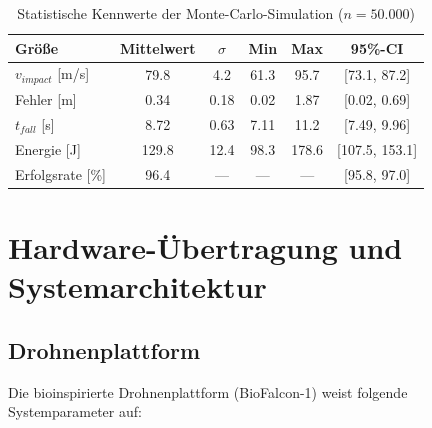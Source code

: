 ﻿\documentclass[12pt,a4paper]{article}
\theoremstyle{remark}
\begin{document}
	\begin{table}[H]
		\centering
		\caption{Statistische Kennwerte der Monte-Carlo-Simulation ($n = 50.000$)}
		\label{tab:statistik}
		\begin{tabular}{lccccc}
			\toprule
			\textbf{Größe} & \textbf{Mittelwert} & \textbf{$\sigma$} & \textbf{Min} & \textbf{Max} & \textbf{95\%-CI} \\
			\midrule
			$v_{impact}$ [m/s] & 79.8 & 4.2 & 61.3 & 95.7 & [73.1, 87.2] \\
			Fehler [m] & 0.34 & 0.18 & 0.02 & 1.87 & [0.02, 0.69] \\
			$t_{fall}$ [s] & 8.72 & 0.63 & 7.11 & 11.2 & [7.49, 9.96] \\
			Energie [J] & 129.8 & 12.4 & 98.3 & 178.6 & [107.5, 153.1] \\
			Erfolgsrate [\%] & 96.4 & --- & --- & --- & [95.8, 97.0] \\
			\bottomrule
		\end{tabular}
	\end{table}
	
	\section{Hardware-Übertragung und Systemarchitektur}
	\label{sec:hardware}
	
	\subsection{Drohnenplattform}
	
	Die bioinspirierte Drohnenplattform (BioFalcon-1) weist folgende Systemparameter auf:
	
\end{document}
